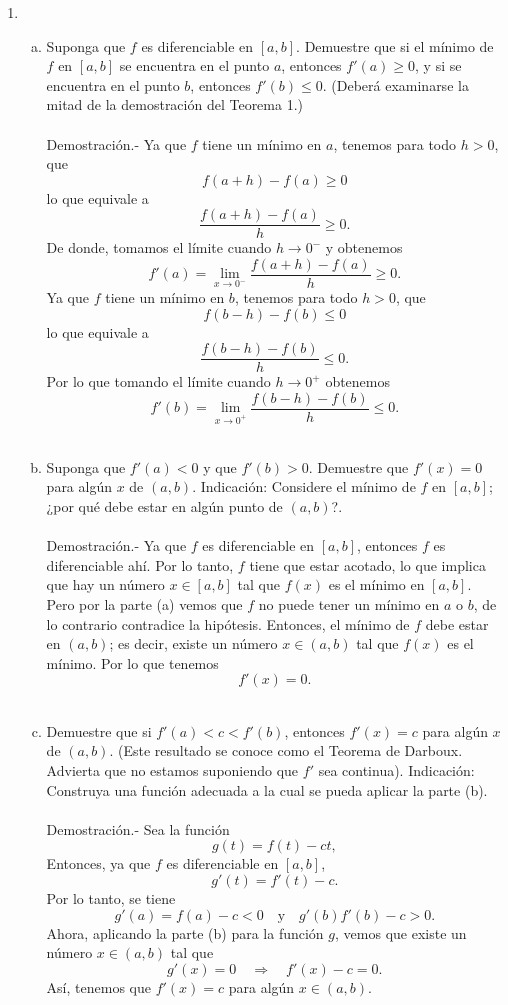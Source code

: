 \begin{enumerate}[\bfseries 1.]
    \item 
	\begin{enumerate}[(a)]

	    \item Suponga que $f$ es diferenciable en $[a,b]$. Demuestre que si el mínimo de $f$ en $[a,b]$ se encuentra en el punto $a$, entonces $f'(a)\geq 0$, y si se encuentra en el punto $b$, entonces $f'(b)\leq 0.$ (Deberá examinarse la mitad de la demostración del Teorema 1.)\\\\
		Demostración.-\; Ya que $f$ tiene un mínimo en $a$, tenemos para todo $h>0$, que
		$$f(a+h)-f(a)\geq 0$$
		lo que equivale a 
		$$\dfrac{f(a+h)-f(a)}{h}\geq 0.$$
		De donde, tomamos el límite cuando $h\to 0^-$ y obtenemos
		$$f'(a)=\lim_{x\to 0^{-}}\dfrac{f(a+h)-f(a)}{h}\geq 0.$$
		Ya que $f$ tiene un mínimo en $b$, tenemos para todo $h>0$, que
		$$f(b-h)-f(b)\leq 0$$
		lo que equivale a 
		$$\dfrac{f(b-h)-f(b)}{h}\leq 0.$$
		Por lo que tomando el límite cuando $h\to 0^+$ obtenemos
		$$f'(b)=\lim_{x\to 0^+}\dfrac{f(b-h)-f(b)}{h}\leq 0.$$\\

	    \item Suponga que $f'(a)<0$ y que $f'(b)>0.$ Demuestre que $f'(x)=0$ para algún $x$ de $(a,b)$. Indicación: Considere el mínimo de $f$ en $[a,b]$; ¿por qué debe estar en algún punto de $(a,b)$?.\\\\
		Demostración.-\; Ya que $f$ es diferenciable en $[a,b]$, entonces $f$ es diferenciable ahí. Por lo tanto, $f$ tiene que estar acotado, lo que implica que hay un número $x\in [a,b]$ tal que $f(x)$ es el mínimo en $[a,b]$. Pero por la parte (a) vemos que $f$ no puede tener un mínimo en $a$ o $b$, de lo contrario contradice la hipótesis. Entonces, el mínimo de $f$ debe estar en $(a,b)$; es decir, existe un número $x\in(a,b)$ tal que $f(x)$ es el mínimo. Por lo que tenemos 
		$$f'(x)=0.$$\\

	    \item Demuestre que si $f'(a)<c<f'(b)$, entonces $f'(x)=c$ para algún $x$ de $(a,b)$. (Este resultado se conoce como el Teorema de Darboux. Advierta que no estamos suponiendo que $f'$ sea continua). Indicación: Construya una función adecuada a la cual se pueda aplicar la parte (b).\\\\ 
		Demostración.-\; Sea la función 
		$$g(t)=f(t)-ct,$$
		Entonces, ya que $f$ es diferenciable en $[a,b]$, 
		$$g'(t)=f'(t)-c.$$
		Por lo tanto, se tiene
		$$g'(a)=f(a)-c<0\quad\mbox{y}\quad g'(b)f'(b)-c>0.$$
		Ahora, aplicando la parte (b) para la función $g$, vemos que existe un número $x\in(a,b)$ tal que 
		$$g'(x)=0\quad \Rightarrow \quad f'(x)-c=0.$$
		Así, tenemos que $f'(x)=c$ para algún $x\in(a,b)$.\\\\


\end{enumerate}
\end{enumerate}
